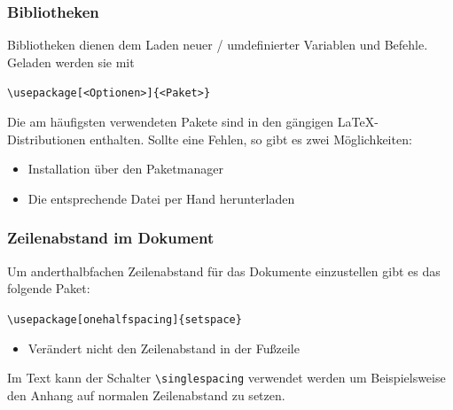\begin{frame}[fragile]
\frametitle{Bibliotheken}
Bibliotheken dienen dem Laden neuer / umdefinierter Variablen und Befehle. Geladen werden sie mit
\begin{center} \lstinline[style=Latex]+\usepackage[<Optionen>]{<Paket>}+ \end{center} \pause
Die am häufigsten verwendeten Pakete sind in den gängigen \LaTeX-Distributionen enthalten. Sollte eine Fehlen, so gibt es zwei Möglichkeiten:
\pause
\begin{itemize}[<+->]
  \item Installation über den Paketmanager
  \item Die entsprechende Datei per Hand herunterladen %
\end{itemize}
\end{frame}



\begin{frame}[fragile,t]
\frametitle{Zeilenabstand im Dokument}
Um anderthalbfachen Zeilenabstand für das Dokumente einzustellen gibt es das folgende Paket:
\begin{center}
 \lstinline[style=Latex]+\usepackage[onehalfspacing]{setspace}+
\end{center}
\begin{itemize}
	\item Verändert nicht den Zeilenabstand in der Fußzeile
\end{itemize}
Im Text kann der Schalter \lstinline[style=Latex]+\singlespacing+ verwendet werden um Beispielsweise den Anhang auf normalen Zeilenabstand zu setzen.
\end{frame}



